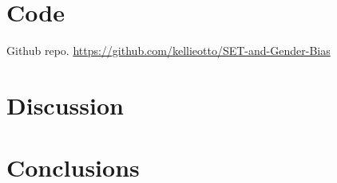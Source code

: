 \documentclass[12pt]{article}
\begin{document}
%

\section{Code}
Github repo. \url{https://github.com/kellieotto/SET-and-Gender-Bias}

\section{Discussion}

\section{Conclusions}
\end{document}
